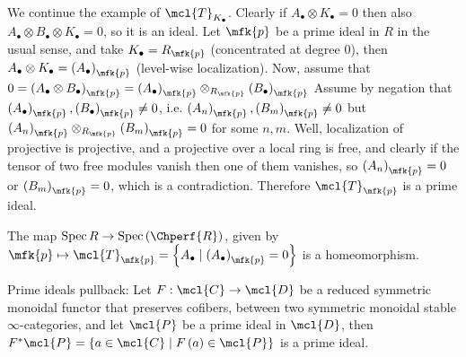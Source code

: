 \begin{example}
	We continue the example of $\mcl{T}_{K_\bullet}$.
	Clearly if $A_\bullet \otimes K_\bullet = 0$ then also $A_\bullet \otimes B_\bullet \otimes K_\bullet = 0$, so it is an ideal.
	Let $\mfk{p}$ be a prime ideal in $R$ in the usual sense, and take $K_\bullet = R_\mfk{p}$ (concentrated at degree $0$),
	then $A_\bullet \otimes K_\bullet = \left(A_\bullet\right)_\mfk{p}$ (level-wise localization).
	Now, assume that
	$
	0
	= \left(A_\bullet \otimes B_\bullet\right)_\mfk{p}
	= \left(A_\bullet\right)_\mfk{p} \otimes_{R_\mfk{p}} \left(B_\bullet\right)_\mfk{p}
	$
	Assume by negation that $\left(A_\bullet\right)_\mfk{p}, \left(B_\bullet\right)_\mfk{p} \neq 0$,
	i.e. $\left(A_n\right)_\mfk{p}, \left(B_m\right)_\mfk{p} \neq 0$ but $\left(A_n\right)_\mfk{p} \otimes_{R_\mfk{p}} \left(B_m\right)_\mfk{p} = 0$ for some $n,m$.
	Well, localization of projective is projective, and a projective over a local ring is free, and clearly if the tensor of two free modules vanish then one of them vanishes, so $\left(A_n\right)_\mfk{p} = 0$ or $\left(B_m\right)_\mfk{p} = 0$, which is a contradiction.
	Therefore $\mcl{T}_\mfk{p}$ is a prime ideal.
\end{example}

\begin{theorem}
	The map $\spec R \to \spec\left(\Chperf{R}\right)$,
	given by $\mfk{p} \mapsto \mcl{T}_\mfk{p} = \left\{ A_\bullet \mid \left(A_\bullet\right)_\mfk{p} = 0 \right\}$
	is a homeomorphism.
\end{theorem}

\begin{proposition}\label{primes-pullback}
	Prime ideals pullback:
	Let $F: \mcl{C} \to \mcl{D}$ be a reduced symmetric monoidal functor that preserves cofibers, between two symmetric monoidal stable $\infty$-categories,
	and let $\mcl{P}$ be a prime ideal in $\mcl{D}$, then $F^*\mcl{P} = \left\{ a \in \mcl{C} \mid F\left(a\right) \in \mcl{P} \right\}$ is a prime ideal.
\end{proposition}

